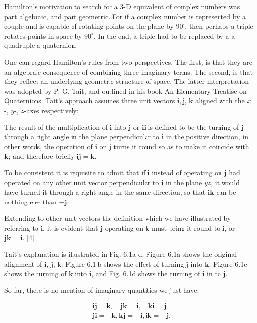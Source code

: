 Hamilton's motivation to search for a 3-D equivalent of complex numbers was part algebraic, and part geometric. For if a complex number is represented by a couple and is capable of rotating points on the plane by $90^{\circ}$, then perhaps a triple rotates points in space by $90^{\circ}$. In the end, a triple had to be replaced by a a quadruple-a quaternion.

One can regard Hamilton's rules from two perspectives. The first, is that they are an algebraic consequence of combining three imaginary terms. The second, is that they reflect an underlying geometric structure of space. The latter interpretation was adopted by P. G. Tait, and outlined in his book An Elementary Treatise on Quaternions. Tait's approach assumes three unit vectors $\mathbf{i}, \mathbf{j}$, $\mathbf{k}$ aligned with the $x$-, $y$-, $z$-axes respectively:

The result of the multiplication of $\mathbf{i}$ into $\mathbf{j}$ or $\mathbf{i} \mathbf{i}$ is defined to be the turning of $\mathbf{j}$ through a right angle in the plane perpendicular to $\mathbf{i}$ in the positive direction, in other words, the operation of $\mathbf{i}$ on $\mathbf{j}$ turns it round so as to make it coincide with $\mathbf{k}$; and therefore briefly $\mathbf{i} \mathbf{j}=\mathbf{k}$.

To be consistent it is requisite to admit that if $\mathbf{i}$ instead of operating on $\mathbf{j}$ had operated on any other unit vector perpendicular to $\mathbf{i}$ in the plane $y z$, it would have turned it through a right-angle in the same direction, so that $\mathbf{i k}$ can be nothing else than $-\mathbf{j}$.

Extending to other unit vectors the definition which we have illustrated by referring to $\mathbf{i}$, it is evident that $\mathbf{j}$ operating on $\mathbf{k}$ must bring it round to $\mathbf{i}$, or $\mathbf{j} \mathbf{k}=\mathbf{i}$. [4]

Tait's explanation is illustrated in Fig. 6.1a-d. Figure 6.1a shows the original alignment of $\mathbf{i}$, $\mathbf{j}$, k. Figure $6.1 \mathrm{~b}$ shows the effect of turning $\mathbf{j}$ into $\mathbf{k}$. Figure 6.1c shows the turning of $\mathbf{k}$ into $\mathbf{i}$, and Fig. 6.1d shows the turning of $\mathbf{i}$ in to $\mathbf{j}$.

So far, there is no mention of imaginary quantities-we just have:

$$
    \begin{aligned}
         & \mathbf{i j}=\mathbf{k}, \quad \mathbf{j k}=\mathbf{i}, \quad \mathbf{k i}=\mathbf{j} \\
         & \mathbf{j i}=-\mathbf{k}, \mathbf{k j}=-\mathbf{i}, \mathbf{i k}=-\mathbf{j} .
    \end{aligned}
$$

